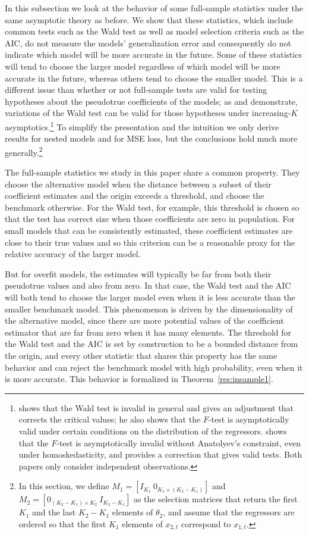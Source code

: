 \documentclass[12pt,draft]{article}
\begin{document}
In this subsection we look at the behavior of some full-sample
statistics under the same asymptotic theory as before.  We show that
these statistics, which include common tests such as the Wald test as
well as model selection criteria such as the AIC, do not measure the
models' generalization error and consequently do not indicate which
model will be more accurate in the future. Some of these statistics
will tend to choose the larger model regardless of which model will be
more accurate in the future, whereas others tend to choose the smaller
model.  This is a different issue than whether or not full-sample
tests are valid for testing hypotheses about the pseudotrue
coefficients of the models; as \citet{Cal:11c} and \citet{Ana:12}
demonstrate, variations of the Wald test can be valid for those
hypotheses under increasing-$K$ asymptotics.\footnote{%
  \citet{Ana:12} shows that the Wald test is invalid in general and
  gives an adjustment that corrects the critical values; he also shows
  that the $F$-test is asymptotically valid under certain conditions
  on the distribution of the regressors.  \citet{Cal:11c} shows that
  the $F$-test is asymptotically invalid without Anatolyev's
  constraint, even under homoskedasticity, and provides a correction
  that gives valid tests.  Both papers only consider independent
  observations.} %
To simplify the presentation and the intuition we only derive results
for nested models and for MSE loss, but the conclusions hold much more
generally.\footnote{%
  In this section, we define
  $M_1 = [I_{K_1} \ 0_{K_1 \times (K_2 - K_1)}]$ and
  $M_2 = [0_{(K_2 - K_1) \times K_2} \ I_{K_2 - K_1}]$ as the
  selection matrices that return the first $K_1$ and the last
  $K_2 - K_1$ elements of $\theta_2$, and assume that the regressors
  are ordered so that the first $K_1$ elements of $x_{2,t}$ correspond
  to $x_{1,t}$.} %

The full-sample statistics we study in this paper share a common
property. They choose the alternative model when the distance between
a subset of their coefficient estimates and the origin exceeds a
threshold, and choose the benchmark otherwise. For the Wald test, for
example, this threshold is chosen so that the test has correct size
when those coefficients are zero in population. For small models that
can be consistently estimated, these coefficient estimates are close
to their true values and so this criterion can be a reasonable proxy
for the relative accuracy of the larger model.

But for overfit models, the estimates will typically be far from both
their pseudotrue values and also from zero. In that case, the Wald test and
the AIC will both tend to choose the larger model even when it is less
accurate than the smaller benchmark model. This phenomenon is driven
by the dimensionality of the alternative model, since there are more
potential values of the coefficient estimator that are far from zero
when it has many elements. The threshold for the Wald test and the AIC
is set by construction to be a bounded distance from the origin, and
every other statistic that shares this property has the same behavior
and can reject the benchmark model with high probability, even when
it is more accurate. This behavior is
formalized in Theorem~\ref{res:insample1}.
\end{document}
